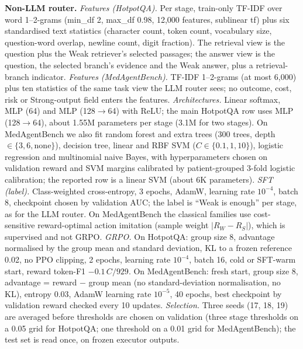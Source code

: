 \documentclass{article}
\begin{document}
\textbf{Non-LLM router.} \emph{Features (HotpotQA).} Per stage, train-only TF-IDF over word 1--2-grams (min\_df 2, max\_df 0.98, 12,000 features, sublinear tf) plus six standardised text statistics (character count, token count, vocabulary size, question-word overlap, newline count, digit fraction). The retrieval view is the question plus the Weak retriever's selected passages; the answer view is the question, the selected branch's evidence and the Weak answer, plus a retrieval-branch indicator. \emph{Features (MedAgentBench).} TF-IDF 1--2-grams (at most 6,000) plus ten statistics of the same task view the LLM router sees; no outcome, cost, risk or Strong-output field enters the features. \emph{Architectures.} Linear softmax, MLP (64) and MLP (128$\to$64) with ReLU; the main HotpotQA row uses MLP (128$\to$64), about 1.55M parameters per stage (3.1M for two stages). On MedAgentBench we also fit random forest and extra trees (300 trees, depth $\in\{3,6,\text{none}\}$), decision tree, linear and RBF SVM ($C\in\{0.1,1,10\}$), logistic regression and multinomial naive Bayes, with hyperparameters chosen on validation reward and SVM margins calibrated by patient-grouped 3-fold logistic calibration; the reported row is a linear SVM (about 6K parameters). \emph{SFT (label).} Class-weighted cross-entropy, 3 epochs, AdamW, learning rate $10^{-4}$, batch 8, checkpoint chosen by validation AUC; the label is ``Weak is enough'' per stage, as for the LLM router. On MedAgentBench the classical families use cost-sensitive reward-optimal action imitation (sample weight $|R_W-R_S|$), which is supervised and not GRPO. \emph{GRPO.} On HotpotQA: group size 8, advantage normalised by the group mean and standard deviation, KL to a frozen reference 0.02, no PPO clipping, 2 epochs, learning rate $10^{-4}$, batch 16, cold or SFT-warm start, reward token-F1 $-0.1\,C/929$. On MedAgentBench: fresh start, group size 8, advantage = reward $-$ group mean (no standard-deviation normalisation, no KL), entropy 0.03, AdamW learning rate $10^{-5}$, 40 epochs, best checkpoint by validation reward checked every 10 updates. \emph{Selection.} Three seeds (17, 18, 19) are averaged before thresholds are chosen on validation (three stage thresholds on a 0.05 grid for HotpotQA; one threshold on a 0.01 grid for MedAgentBench); the test set is read once, on frozen executor outputs.
\end{document}
